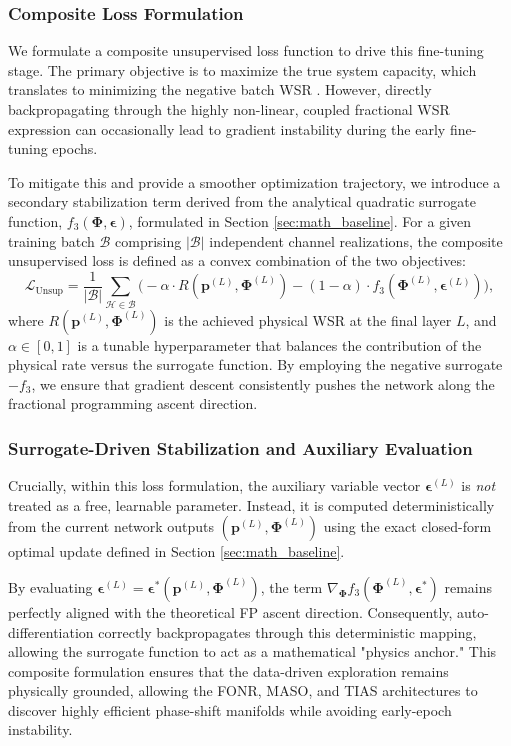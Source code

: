 \documentclass[journal]{IEEEtran}
\begin{document}
\subsubsection{Composite Loss Formulation}
We formulate a composite unsupervised loss function to drive this fine-tuning stage. The primary objective is to maximize the true system capacity, which translates to minimizing the negative batch WSR . However, directly backpropagating through the highly non-linear, coupled fractional WSR expression can occasionally lead to gradient instability during the early fine-tuning epochs. 

To mitigate this and provide a smoother optimization trajectory, we introduce a secondary stabilization term derived from the analytical quadratic surrogate function, $f_3(\boldsymbol{\Phi}, \boldsymbol{\epsilon})$, formulated in Section \ref{sec:math_baseline}. For a given training batch $\mathcal{B}$ comprising $|\mathcal{B}|$ independent channel realizations, the composite unsupervised loss is defined as a convex combination of the two objectives:
\begin{equation}
    \mathcal{L}_{\text{Unsup}} = \frac{1}{|\mathcal{B}|} \sum_{\mathcal{H} \in \mathcal{B}} \Big( -\alpha \cdot R(\mathbf{p}^{(L)}, \boldsymbol{\Phi}^{(L)}) - (1-\alpha) \cdot f_3(\boldsymbol{\Phi}^{(L)}, \boldsymbol{\epsilon}^{(L)}) \Big),
    \label{eq:composite_loss}
\end{equation}
where $R(\mathbf{p}^{(L)}, \boldsymbol{\Phi}^{(L)})$ is the achieved physical WSR at the final layer $L$, and $\alpha \in [0, 1]$ is a tunable hyperparameter that balances the contribution of the physical rate versus the surrogate function. By employing the negative surrogate $-f_3$, we ensure that gradient descent consistently pushes the network along the fractional programming ascent direction.

\subsubsection{Surrogate-Driven Stabilization and Auxiliary Evaluation}
Crucially, within this loss formulation, the auxiliary variable vector $\boldsymbol{\epsilon}^{(L)}$ is \textit{not} treated as a free, learnable parameter. Instead, it is computed deterministically from the current network outputs $(\mathbf{p}^{(L)}, \boldsymbol{\Phi}^{(L)})$ using the exact closed-form optimal update defined in Section \ref{sec:math_baseline}. 

By evaluating $\boldsymbol{\epsilon}^{(L)} = \boldsymbol{\epsilon}^*(\mathbf{p}^{(L)}, \boldsymbol{\Phi}^{(L)})$, the term $\nabla_{\boldsymbol{\Phi}} f_3(\boldsymbol{\Phi}^{(L)}, \boldsymbol{\epsilon}^*)$ remains perfectly aligned with the theoretical FP ascent direction. Consequently, auto-differentiation correctly backpropagates through this deterministic mapping, allowing the surrogate function to act as a mathematical "physics anchor." This composite formulation ensures that the data-driven exploration remains physically grounded, allowing the FONR, MASO, and TIAS architectures to discover highly efficient phase-shift manifolds while avoiding early-epoch instability.
\end{document}
